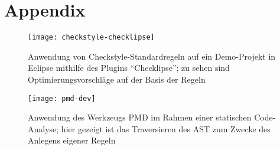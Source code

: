 
\section{Appendix}

\begin{figure}[h!]
\centering
\texttt{[image: checkstyle-checklipse]}
\caption{Anwendung von Checkstyle-Standardregeln auf ein Demo-Projekt in Eclipse mithilfe des Plugins ``Checklipse''; zu sehen sind Optimierungsvorschläge auf der Basis der Regeln}
\label{fig:checklipse}
\end{figure}

\newpage

\begin{figure}
\centering
\texttt{[image: pmd-dev]}
\caption{Anwendung des Werkzeugs PMD im Rahmen einer statischen Code-Analyse; hier gezeigt ist das Traversieren des AST zum Zwecke des Anlegens eigener Regeln}
\label{fig:pmd}
\end{figure}